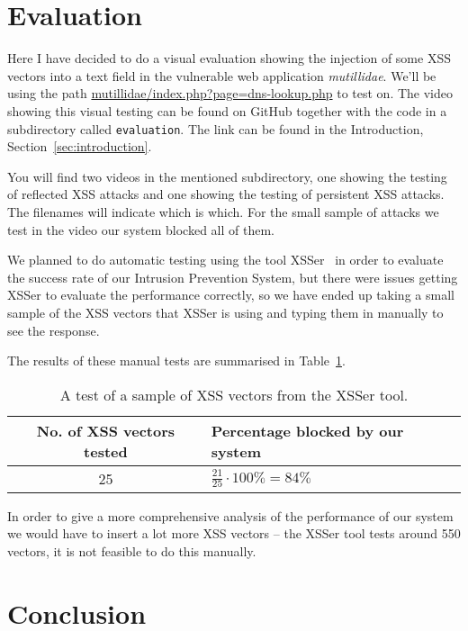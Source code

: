 \documentclass[10pt,journal,compsoc]{IEEEtran}
\begin{document}
\section{Evaluation}

Here I have decided to do a visual evaluation showing the injection of some XSS vectors into a text field in the
vulnerable web application \emph{mutillidae}. We'll be using the path \url{mutillidae/index.php?page=dns-lookup.php} to
test on. The video showing this visual testing can be found on GitHub together with the code in a subdirectory called
\verb|evaluation|. The link can be found in the Introduction, Section~\ref{sec:introduction}.

You will find two videos in the mentioned subdirectory, one showing the testing of reflected XSS attacks and one
showing the testing of persistent XSS attacks.  The filenames will indicate which is which. For the small sample of
attacks we test in the video our system blocked all of them.

We planned to do automatic testing using the tool XSSer~\citep*{xsser} in order to evaluate the success rate of our Intrusion
Prevention System, but there were issues getting XSSer to evaluate the performance correctly, so we have ended up
taking a small sample of the XSS vectors that XSSer is using and typing them in manually to see the response.

The results of these manual tests are summarised in Table~\ref{tab:evaluation}.

\begin{table}
    \caption{A test of a sample of XSS vectors from the XSSer tool.}
    \label{tab:evaluation}
    \begin{tabular}{c|p{.5\linewidth}}
        No. of XSS vectors tested & Percentage blocked by our system \\\hline
        25 & \(\frac{21}{25}\cdot100\% = 84\%\)
    \end{tabular}
\end{table}

In order to give a more comprehensive analysis of the performance of our system we would have to insert a lot more
XSS vectors -- the XSSer tool tests around 550 vectors, it is not feasible to do this manually.



\section{Conclusion}
\end{document}
